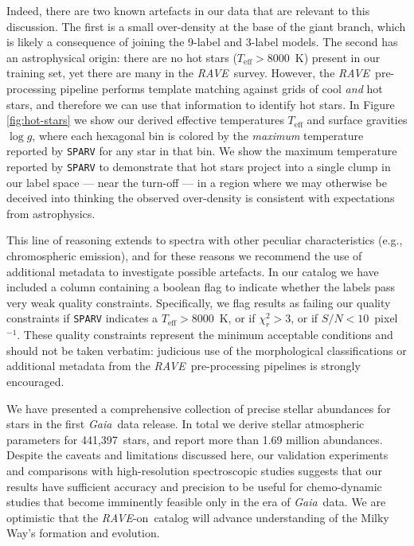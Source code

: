 \documentclass[preprint]{aastex61}
\newcommand{\acronym}[1]{{\small{#1}}}
\newcommand{\project}[1]{\textsl{#1}}
\newcommand{\gaia}{\project{Gaia}}
\newcommand{\rave}{\project{\acronym{RAVE}}}
\newcommand{\raveon}{\rave-on}
\newcommand{\teff}{T_{\mathrm{eff}}}
\newcommand{\logg}{\log g}
\newcommand{\ReportedStellarParameters}{441,397} %
\begin{document}
Indeed, there are two known artefacts in our data that are relevant to this 
discussion. The first is a small over-density at the base of the giant branch, 
which is likely a consequence of joining the 9-label and 3-label models.  The
second has an astrophysical origin: there are no hot stars ($\teff > 8000$~K)
present in our training set, yet there are many in the \rave\ survey.
However, the \rave\ pre-processing pipeline 
\citep[\texttt{SPARV};][]{Steinmetz_2006,Zwitter_2008} performs template 
matching against grids of cool \emph{and} hot stars, and therefore we can use 
that information to identify hot stars.  In Figure \ref{fig:hot-stars} 
we show our derived effective temperatures $\teff$ and surface gravities $\logg$,
where each hexagonal bin is colored by the \emph{maximum} temperature
reported by \texttt{SPARV} for any star in that bin.  We show the maximum
temperature reported by \texttt{SPARV} to demonstrate that hot stars project
into a single clump in our label space --- near the turn-off --- in a region
where we may otherwise be deceived into thinking the observed over-density
is consistent with expectations from astrophysics.  


This line of reasoning extends to spectra with other peculiar characteristics 
(e.g., chromospheric emission), and for these reasons we recommend the use of
additional metadata to investigate possible artefacts.  In our catalog we have
included a column containing a boolean flag to indicate whether the labels pass
very weak quality constraints.  Specifically, we flag results as failing our
quality constraints if \texttt{SPARV} indicates a $\teff > 8000$~K, or if 
$\chi_r^2 > 3$, or if $S/N < 10$~pixel$^{-1}$.  These quality constraints 
represent the minimum acceptable conditions and should not be taken verbatim: 
judicious use of the morphological classifications \citep{Matijevic_2012} or 
additional metadata from the \rave\ pre-processing pipelines is strongly 
encouraged.


We have presented a comprehensive collection of precise stellar abundances 
for stars in the first \gaia\ data release.  In total we derive stellar 
atmospheric parameters for \ReportedStellarParameters\ stars, and report more 
than 1.69 million abundances.  Despite the caveats and limitations discussed here, 
our validation experiments and comparisons with high-resolution spectroscopic
studies suggests that our results have sufficient accuracy and precision to
be useful for chemo-dynamic studies that become imminently feasible only in
the era of \gaia\ data.  We are optimistic that the \raveon\ catalog will 
advance understanding of the Milky Way's formation and evolution.
\end{document}
